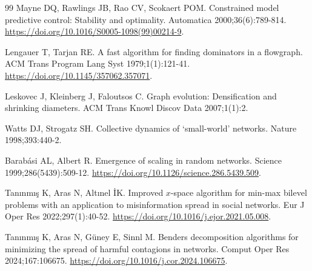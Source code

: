 \documentclass[preprint,11pt]{elsarticle}
\theoremstyle{definition}
\theoremstyle{remark}
\begin{document}
\begin{thebibliography}{99}
Mayne DQ, Rawlings JB, Rao CV, Scokaert POM. Constrained model predictive control: Stability and optimality. Automatica 2000;36(6):789-814. \url{https://doi.org/10.1016/S0005-1098(99)00214-9}.

Lengauer T, Tarjan RE. A fast algorithm for finding dominators in a flowgraph. ACM Trans Program Lang Syst 1979;1(1):121-41. \url{https://doi.org/10.1145/357062.357071}.

Leskovec J, Kleinberg J, Faloutsos C. Graph evolution: Densification and shrinking diameters. ACM Trans Knowl Discov Data 2007;1(1):2.

Watts DJ, Strogatz SH. Collective dynamics of `small-world' networks. Nature 1998;393:440-2.

Barabási AL, Albert R. Emergence of scaling in random networks. Science 1999;286(5439):509-12. \url{https://doi.org/10.1126/science.286.5439.509}.

Tanınmış K, Aras N, Altınel İK. Improved $x$-space algorithm for min-max bilevel problems with an application to misinformation spread in social networks. Eur J Oper Res 2022;297(1):40-52. \url{https://doi.org/10.1016/j.ejor.2021.05.008}.

Tanınmış K, Aras N, Güney E, Sinnl M. Benders decomposition algorithms for minimizing the spread of harmful contagions in networks. Comput Oper Res 2024;167:106675. \url{https://doi.org/10.1016/j.cor.2024.106675}.

\end{thebibliography}
\end{document}
